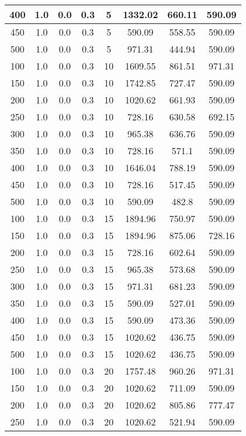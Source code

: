 \documentclass[a4paper, 12pt]{extreport}
\begin{document}
\begin{itemize}
\begin{longtable}{|c|c|c|c|c|c|c|c|}
			400 & 1.0 & 0.0 & 0.3 & 5 & 1332.02 & 660.11 & 590.09 \\\hline
			450 & 1.0 & 0.0 & 0.3 & 5 & 590.09 & 558.55 & 590.09 \\\hline
			500 & 1.0 & 0.0 & 0.3 & 5 & 971.31 & 444.94 & 590.09 \\\hline
			100 & 1.0 & 0.0 & 0.3 & 10 & 1609.55 & 861.51 & 971.31 \\\hline
			150 & 1.0 & 0.0 & 0.3 & 10 & 1742.85 & 727.47 & 590.09 \\\hline
			200 & 1.0 & 0.0 & 0.3 & 10 & 1020.62 & 661.93 & 590.09 \\\hline
			250 & 1.0 & 0.0 & 0.3 & 10 & 728.16 & 630.58 & 692.15 \\\hline
			300 & 1.0 & 0.0 & 0.3 & 10 & 965.38 & 636.76 & 590.09 \\\hline
			350 & 1.0 & 0.0 & 0.3 & 10 & 728.16 & 571.1 & 590.09 \\\hline
			400 & 1.0 & 0.0 & 0.3 & 10 & 1646.04 & 788.19 & 590.09 \\\hline
			450 & 1.0 & 0.0 & 0.3 & 10 & 728.16 & 517.45 & 590.09 \\\hline
			500 & 1.0 & 0.0 & 0.3 & 10 & 590.09 & 482.8 & 590.09 \\\hline
			100 & 1.0 & 0.0 & 0.3 & 15 & 1894.96 & 750.97 & 590.09 \\\hline
			150 & 1.0 & 0.0 & 0.3 & 15 & 1894.96 & 875.06 & 728.16 \\\hline
			200 & 1.0 & 0.0 & 0.3 & 15 & 728.16 & 602.64 & 590.09 \\\hline
			250 & 1.0 & 0.0 & 0.3 & 15 & 965.38 & 573.68 & 590.09 \\\hline
			300 & 1.0 & 0.0 & 0.3 & 15 & 971.31 & 681.23 & 590.09 \\\hline
			350 & 1.0 & 0.0 & 0.3 & 15 & 590.09 & 527.01 & 590.09 \\\hline
			400 & 1.0 & 0.0 & 0.3 & 15 & 590.09 & 473.36 & 590.09 \\\hline
			450 & 1.0 & 0.0 & 0.3 & 15 & 1020.62 & 436.75 & 590.09 \\\hline
			500 & 1.0 & 0.0 & 0.3 & 15 & 1020.62 & 436.75 & 590.09 \\\hline
			100 & 1.0 & 0.0 & 0.3 & 20 & 1757.48 & 960.26 & 971.31 \\\hline
			150 & 1.0 & 0.0 & 0.3 & 20 & 1020.62 & 711.09 & 590.09 \\\hline
			200 & 1.0 & 0.0 & 0.3 & 20 & 1020.62 & 805.86 & 777.47 \\\hline
			250 & 1.0 & 0.0 & 0.3 & 20 & 1020.62 & 521.94 & 590.09 \\\hline

\end{longtable}
\end{itemize}
\end{document}
